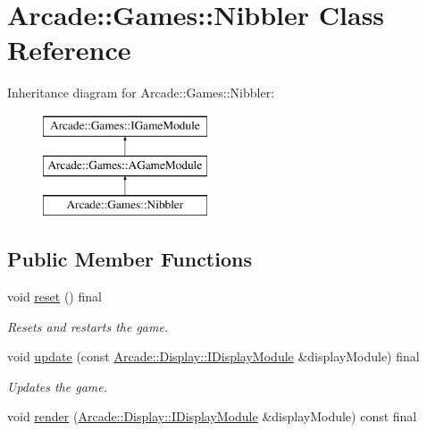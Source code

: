 \hypertarget{classArcade_1_1Games_1_1Nibbler}{}\section{Arcade\+::Games\+::Nibbler Class Reference}
\label{classArcade_1_1Games_1_1Nibbler}
Inheritance diagram for Arcade\+::Games\+::Nibbler\+:\begin{figure}[H]
\begin{center}
\leavevmode
\includegraphics[height=3.000000cm]{classArcade_1_1Games_1_1Nibbler}
\end{center}
\end{figure}
\subsection*{Public Member Functions}
\begin{DoxyCompactItemize}
\item 
\mbox{\label{classArcade_1_1Games_1_1Nibbler_ab07050c302d764a32e42db43664e4687}} 
void \mbox{\hyperlink{classArcade_1_1Games_1_1Nibbler_ab07050c302d764a32e42db43664e4687}{reset}} () final
\begin{DoxyCompactList}\small\item\em Resets and restarts the game. \end{DoxyCompactList}\item 
void \mbox{\hyperlink{classArcade_1_1Games_1_1Nibbler_a6a44a75ab1905647587d7a6314155955}{update}} (const \mbox{\hyperlink{classArcade_1_1Display_1_1IDisplayModule}{Arcade\+::\+Display\+::\+I\+Display\+Module}} \&display\+Module) final
\begin{DoxyCompactList}\small\item\em Updates the game. \end{DoxyCompactList}\item 
void \mbox{\hyperlink{classArcade_1_1Games_1_1Nibbler_afd52ee2fad66523b58f94f9eb582145e}{render}} (\mbox{\hyperlink{classArcade_1_1Display_1_1IDisplayModule}{Arcade\+::\+Display\+::\+I\+Display\+Module}} \&display\+Module) const final
\end{DoxyCompactItemize}
